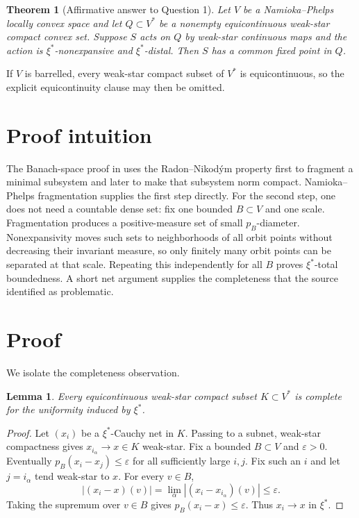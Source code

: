 \documentclass[11pt]{article}
\newtheorem{theorem}{Theorem}
\newtheorem{lemma}{Lemma}
\begin{document}
\begin{theorem}[Affirmative answer to Question 1]\label{thm:main}
Let $V$ be a Namioka--Phelps locally convex space and let
$Q\subset V^*$ be a nonempty equicontinuous weak-star compact convex set.
Suppose $S$ acts on $Q$ by weak-star continuous maps and the action is
$\xi^*$-nonexpansive and $\xi^*$-distal.  Then $S$ has a common fixed point
in $Q$.
\end{theorem}

If $V$ is barrelled, every weak-star compact subset of $V^*$ is
equicontinuous, so the explicit equicontinuity clause may then be omitted.

\section{Proof intuition}

The Banach-space proof in \cite{Wisnicki2020} uses the Radon--Nikod\'ym
property first to fragment a minimal subsystem and later to make that subsystem
norm compact.  Namioka--Phelps fragmentation supplies the first step directly.
For the second step, one does not need a countable dense set: fix one bounded
$B\subset V$ and one scale.  Fragmentation produces a positive-measure set of
small $p_B$-diameter.  Nonexpansivity moves such sets to neighborhoods of all
orbit points without decreasing their invariant measure, so only finitely many
orbit points can be separated at that scale.  Repeating this independently for
all $B$ proves $\xi^*$-total boundedness.  A short net argument supplies the
completeness that the source identified as problematic.

\section{Proof}

We isolate the completeness observation.

\begin{lemma}\label{lem:complete}
Every equicontinuous weak-star compact subset $K\subset V^*$ is complete for
the uniformity induced by $\xi^*$.
\end{lemma}

\begin{proof}
Let $(x_i)$ be a $\xi^*$-Cauchy net in $K$.  Passing to a subnet, weak-star
compactness gives $x_{i_\alpha}\to x\in K$ weak-star.  Fix a bounded
$B\subset V$ and $\varepsilon>0$.  Eventually
$p_B(x_i-x_j)\le\varepsilon$ for all sufficiently large $i,j$.  Fix such an
$i$ and let $j=i_\alpha$ tend weak-star to $x$.  For every $v\in B$,
\[
 |(x_i-x)(v)|=\lim_\alpha |(x_i-x_{i_\alpha})(v)|\le\varepsilon.
\]
Taking the supremum over $v\in B$ gives $p_B(x_i-x)\le\varepsilon$.
Thus $x_i\to x$ in $\xi^*$.
\end{proof}
\end{document}
